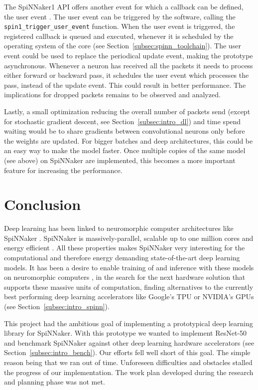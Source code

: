 \documentclass[]{article}
\begin{document}
The SpiNNaker1 API offers another event for which a callback can
be defined, the user event \citep{furber_et_al_2020}.
The user event can be triggered by the software, calling the
\texttt{spin1\_\-trigger\_user\_event} function.
When the user event is triggered, the registered callback is queued
and executed, whenever it is scheduled by the operating system of the
core (see Section~\ref{subsec:spinn_toolchain}).
The user event could be used to replace the periodical update event,
making the prototype asynchronous.
Whenever a neuron has received all the packets it needs to process
either forward or backward pass, it schedules the user event which
processes the pass, instead of the update event.
This could result in better performance.
The implications for dropped packets remains to be observed and
analyzed.

Lastly, a small optimization reducing the overall number of packets
send (except for stochastic gradient descent, see
Section~\ref{subsec:intro_dl}) and time spend waiting would be to
share gradients between convolutional neurons only before the weights
are updated.
For bigger batches and deep architectures, this could be an easy way
to make the model faster.
Once multiple copies of the same model (see above) on SpiNNaker are
implemented, this becomes a more important feature for increasing the
performance.



\section{Conclusion} %
\label{sec:conclusion}

Deep learning has been linked to neuromorphic computer architectures
like SpiNNaker \citep{gomes_2017}.
SpiNNaker is massively-parallel, scalable up to one million cores
and energy efficient \citep{furber_et_al_2020}.
All these properties makes SpiNNaker very interesting for the
computational and therefore energy demanding state-of-the-art deep
learning models.
It has been a desire to enable training of and inference with these
models on neuromorphic computers \citep{gomes_2017}, in the search for
the next hardware solution that supports these massive units of
computation, finding alternatives to the currently best performing
deep learning accelerators like Google's TPU or NVIDIA's GPUs
(see Section~\ref{subsec:intro_spinn}).

This project had the ambitious goal of implementing a prototypical
deep learning library for SpiNNaker.
With this prototype we wanted to implement ResNet-50 and benchmark
SpiNNaker against other deep learning hardware accelerators
(see Section~\ref{subsec:intro_bench}).
Our efforts fell well short of this goal.
The simple reason being that we ran out of time.
Unforeseen difficulties and obstacles stalled the progress of
our implementation.
The work plan developed during the research and planning phase was
not met.
\end{document}
